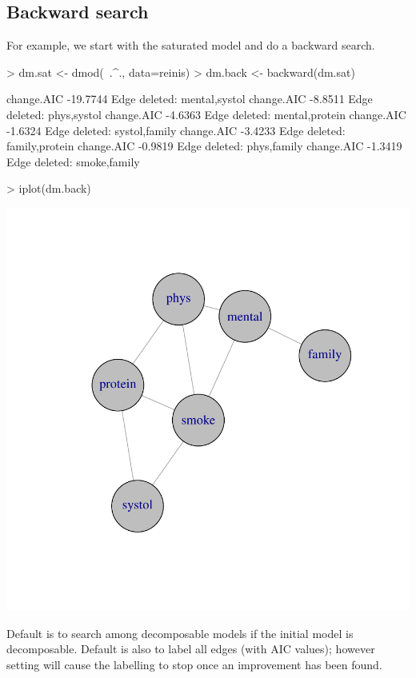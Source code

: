 \documentclass[12pt]{article}
\begin{document}
\subsection{Backward search}
\label{sec:xxx}

For example, we start with the saturated model and do a backward search.

\begin{Schunk}
\begin{Sinput}
> dm.sat <- dmod(~.^., data=reinis)
> dm.back <- backward(dm.sat)
\end{Sinput}
\begin{Soutput}
  change.AIC  -19.7744 Edge deleted: mental,systol
  change.AIC   -8.8511 Edge deleted: phys,systol
  change.AIC   -4.6363 Edge deleted: mental,protein
  change.AIC   -1.6324 Edge deleted: systol,family
  change.AIC   -3.4233 Edge deleted: family,protein
  change.AIC   -0.9819 Edge deleted: phys,family
  change.AIC   -1.3419 Edge deleted: smoke,family
\end{Soutput}
\begin{Sinput}
> iplot(dm.back)
\end{Sinput}
\end{Schunk}
\includegraphics{figures/GRIM-034}

Default is to search among decomposable models if the initial model is
decomposable. Default is also to label all edges (with AIC values);
however setting  will cause the labelling to
stop once an improvement has been found.
\end{document}

